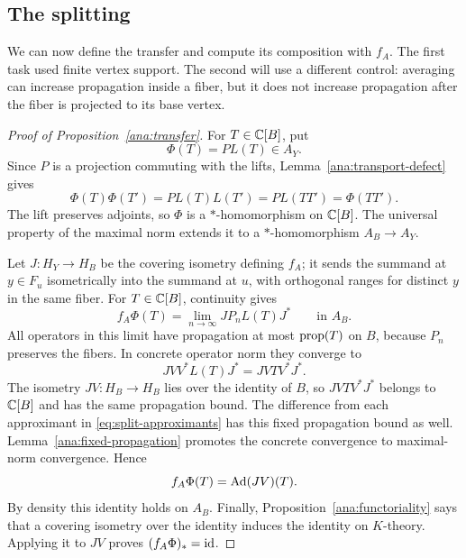 \subsection{The splitting}

We can now define the transfer and compute its composition with $f_A$.
The first task used finite vertex support.  The second will use a
different control: averaging can increase propagation inside a fiber,
but it does not increase propagation after the fiber is projected to its
base vertex.

\begin{proof}[Proof of Proposition~\ref{ana:transfer}]
For $T\in\mathbb C[B]$, put
\[
 \Phi(T)=PL(T)\in A_Y.
\]
Since $P$ is a projection commuting with the lifts,
Lemma~\ref{ana:transport-defect} gives
\[
 \Phi(T)\Phi(T')=P L(T)L(T')=P L(TT')=\Phi(TT').
\]
The lift preserves adjoints, so $\Phi$ is a $*$-homomorphism on
$\mathbb C[B]$.  The universal property of the maximal norm extends it to a
$*$-homomorphism $A_B\to A_Y$.

Let $J:H_Y\to H_B$ be the covering isometry defining $f_A$; it sends
the summand at $y\in F_u$ isometrically into the summand at $u$, with
orthogonal ranges for distinct $y$ in the same fiber.  For
$T\in\mathbb C[B]$, continuity gives
\begin{equation}\label{eq:split-approximants}
 f_A\Phi(T)=\lim_{n\to\infty} J P_nL(T)J^*
 \qquad\text{in }A_B.
\end{equation}
All operators in this limit have propagation at most $\operatorname{prop}(T)$ on
$B$, because $P_n$ preserves the fibers.  In concrete operator norm
they converge to
\[
 JVV^*L(T)J^*=JVT V^*J^*.
\]
The isometry $JV:H_B\to H_B$ lies over the identity of $B$, so
$JVT V^*J^*$ belongs to $\mathbb C[B]$ and has the same propagation bound.
The difference from each approximant in
\eqref{eq:split-approximants} has this fixed propagation bound as well.
Lemma~\ref{ana:fixed-propagation} promotes the concrete convergence to
maximal-norm convergence.  Hence
\begin{equation}\label{eq:split-identity}
 f_A\Phi(T)=\operatorname{Ad}(JV)(T).
\end{equation}
By density this identity holds on $A_B$.
Finally, Proposition~\ref{ana:functoriality} says that a covering isometry
over the identity induces the identity on $K$-theory.  Applying it to
$JV$ proves $(f_A\Phi)_*=\operatorname{id}$.
\end{proof}
